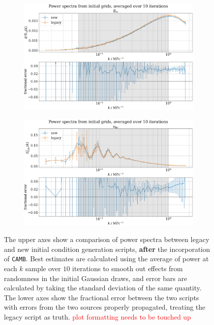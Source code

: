 \documentclass[floats,floatfix,showpacs,amssymb,prd,superscriptaddress,nofootinbib]{revtex4-2} %
\newcommand{\code}{\texttt}
\newcommand{\red}{\textcolor{red}}
\begin{document}
\newpage
\newpage
\begin{figure}[H]
     \centering
     \begin{subfigure}[b]{0.9\textwidth}
         \centering
         \includegraphics[width=\textwidth]{images/ic_power_spectra/compare_generators_averaged_power_spectra_with_residual_delta_m.png}
         \label{fig:compare_generators_power_spectrum_delta_m}
     \end{subfigure}
     \hfill
     \begin{subfigure}[b]{0.9\textwidth}
         \centering
         \includegraphics[width=\textwidth]{images/ic_power_spectra/compare_generators_averaged_power_spectra_with_residual_v_bc.png}
         \label{fig:compare_generators_power_spectrum_vbc}
     \end{subfigure}
        \caption{The upper axes show a comparison of power spectra between legacy and new initial condition generation scripts, \textbf{after} the incorporation of \code{CAMB}. Best estimates are calculated using the average of power at each $k$ sample over $10$ iterations to smooth out effects from randomness in the initial Gaussian draws, and error bars are calculated by taking the standard deviation of the same quantity. The lower axes show the fractional error between the two scripts with errors from the two sources properly propagated, treating the legacy script as truth. \red{plot formatting needs to be touched up}}
        \label{fig:compare_generators}
\end{figure}
\end{document}
